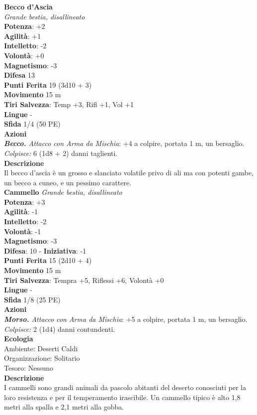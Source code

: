 \begin{multicols}{2}
\medskip\textbf{Becco d'Ascia}\\
\emph{Grande bestia, disallineato}\\
\textbf{Potenza}: +2\\
\textbf{Agilità}: +1\\
\textbf{Intelletto}: -2\\
\textbf{Volontà}: +0\\
\textbf{Magnetismo}: -3\\
\textbf{Difesa} 13\\
\textbf{Punti Ferita} 19 (3d10 + 3)\\
\textbf{Movimento} 15 m\\
\textbf{Tiri Salvezza}: Temp +3, Rifl +1, Vol +1\\
\textbf{Lingue} -\\
\textbf{Sfida} 1/4 (50 PE)\smallskip\\
\smallskip\textbf{Azioni}\\
\emph{\textbf{Becco.} Attacco con Arma da Mischia}: +4 a colpire, portata 1 m, un bersaglio.\\
\emph{Colpisce:} 6 (1d8 + 2) danni taglienti.\\

\textbf{Descrizione}\\
Il becco d'ascia è un grosso e slanciato volatile privo di ali ma con potenti gambe, un becco a cuneo, e un pessimo carattere.\\

\medskip\textbf{Cammello}
\emph{Grande bestia, disallineato}\\
\textbf{Potenza}: +3\\
\textbf{Agilità}: -1\\
\textbf{Intelletto}: -2\\
\textbf{Volontà}: -1\\
\textbf{Magnetismo}: -3\\
\textbf{Difesa}: 10 - \textbf{Iniziativa}: -1\\
\textbf{Punti Ferita} 15 (2d10 + 4)\\
\textbf{Movimento} 15 m\\
\textbf{Tiri Salvezza}: Tempra +5, Riflessi +6, Volontà +0 \\
\textbf{Lingue} -\\
\textbf{Sfida} 1/8 (25 PE)\smallskip\\
\smallskip\textbf{Azioni}\\
\emph{\textbf{Morso.} Attacco con Arma da Mischia}: +5 a colpire, portata 1 m, un bersaglio.\\
\emph{Colpisce:} 2 (1d4) danni contundenti.\\
\textbf{Ecologia}\\
Ambiente: Deserti Caldi\\
Organizzazione: Solitario\\
Tesoro: Nessuno\\
\textbf{Descrizione}\\
I cammelli sono grandi animali da pascolo abitanti del deserto conosciuti per la loro resistenza e per il temperamento irascibile. Un cammello tipico è alto 1,8 metri alla spalla e 2,1 metri alla gobba. \\


\end{multicols}
